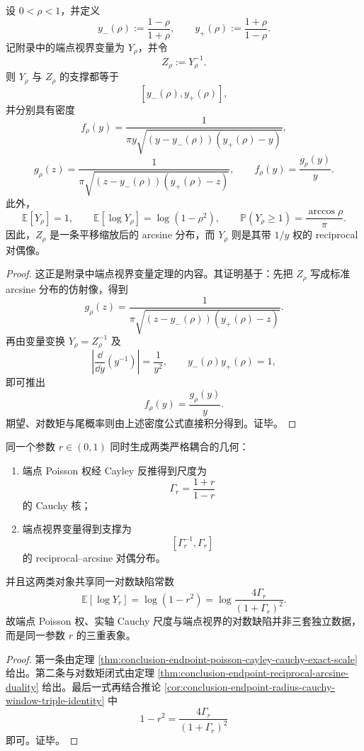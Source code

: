 \begin{theorem}\label{thm:conclusion-endpoint-reciprocal-arcsine-duality}
设 \(0<\rho<1\)，并定义
\[
y_-(\rho):=\frac{1-\rho}{1+\rho},
\qquad
y_+(\rho):=\frac{1+\rho}{1-\rho}.
\]
记附录中的端点视界变量为 \(Y_\rho\)，并令
\[
Z_\rho:=Y_\rho^{-1}.
\]
则 \(Y_\rho\) 与 \(Z_\rho\) 的支撑都等于
\[
[y_-(\rho),y_+(\rho)],
\]
并分别具有密度
\[
f_\rho(y)=\frac{1}{\pi y\sqrt{(y-y_-(\rho))(y_+(\rho)-y)}},
\]
\[
g_\rho(z)=\frac{1}{\pi\sqrt{(z-y_-(\rho))(y_+(\rho)-z)}},
\qquad
f_\rho(y)=\frac{g_\rho(y)}{y}.
\]
此外，
\[
\mathbb E[Y_\rho]=1,
\qquad
\mathbb E[\log Y_\rho]=\log(1-\rho^2),
\qquad
\mathbb P(Y_\rho\ge 1)=\frac{\arccos \rho}{\pi}.
\]
因此，\(Z_\rho\) 是一条平移缩放后的 arcsine 分布，而 \(Y_\rho\) 则是其带 \(1/y\) 权的 reciprocal 对偶像。
\end{theorem}
\begin{proof}
这正是附录中端点视界变量定理的内容。其证明基于：先把 \(Z_\rho\) 写成标准 arcsine 分布的仿射像，得到
\[
g_\rho(z)=\frac{1}{\pi\sqrt{(z-y_-(\rho))(y_+(\rho)-z)}}.
\]
再由变量变换 \(Y_\rho=Z_\rho^{-1}\) 及
\[
\left|\frac{\dd}{\dd y}(y^{-1})\right|=\frac1{y^2},
\qquad
y_-(\rho)y_+(\rho)=1,
\]
即可推出
\[
f_\rho(y)=\frac{g_\rho(y)}{y}.
\]
期望、对数矩与尾概率则由上述密度公式直接积分得到。证毕。
\end{proof}

\begin{corollary}\label{cor:conclusion-poisson-cauchy-endpoint-arcsine-common-parameter}
同一个参数 \(r\in(0,1)\) 同时生成两类严格耦合的几何：
\begin{enumerate}
  \item 端点 Poisson 权经 Cayley 反推得到尺度为
  \[
  \Gamma_r=\frac{1+r}{1-r}
  \]
  的 Cauchy 核；
  \item 端点视界变量得到支撑为
  \[
  [\Gamma_r^{-1},\Gamma_r]
  \]
  的 reciprocal--arcsine 对偶分布。
\end{enumerate}
并且这两类对象共享同一对数缺陷常数
\[
\mathbb E[\log Y_r]
=
\log(1-r^2)
=
\log\frac{4\Gamma_r}{(1+\Gamma_r)^2}.
\]
故端点 Poisson 权、实轴 Cauchy 尺度与端点视界的对数缺陷并非三套独立数据，而是同一参数 \(r\) 的三重表象。
\end{corollary}
\begin{proof}
第一条由定理 \ref{thm:conclusion-endpoint-poisson-cayley-cauchy-exact-scale} 给出。第二条与对数矩闭式由定理 \ref{thm:conclusion-endpoint-reciprocal-arcsine-duality} 给出。最后一式再结合推论 \ref{cor:conclusion-endpoint-radius-cauchy-window-triple-identity} 中
\[
1-r^2=\frac{4\Gamma_r}{(1+\Gamma_r)^2}
\]
即可。证毕。
\end{proof}

\endinput
